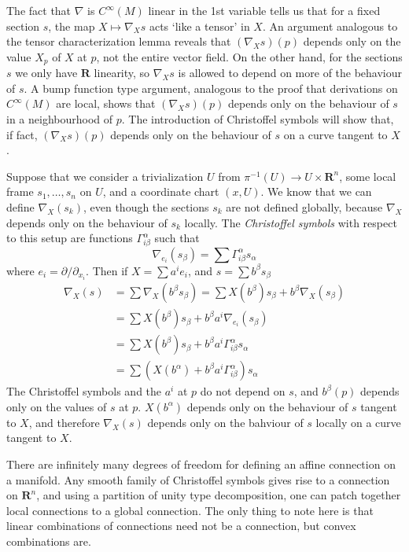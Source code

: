 The fact that $\nabla$ is $C^\infty(M)$ linear in the 1st variable tells us that for a fixed section $s$, the map $X \mapsto \nabla_X s$ acts `like a tensor' in $X$. An argument analogous to the tensor characterization lemma reveals that $(\nabla_X s)(p)$ depends only on the value $X_p$ of $X$ at $p$, not the entire vector field. On the other hand, for the sections $s$ we only have $\mathbf{R}$ linearity, so $\nabla_X s$ is allowed to depend on more of the behaviour of $s$. A bump function type argument, analogous to the proof that derivations on $C^\infty(M)$ are local, shows that $(\nabla_X s)(p)$ depends only on the behaviour of $s$ in a neighbourhood of $p$. The introduction of Christoffel symbols will show that, if fact, $(\nabla_X s)(p)$ depends only on the behaviour of $s$ on a curve tangent to $X$.

Suppose that we consider a trivialization $U$ from $\pi^{-1}(U) \to U \times \mathbf{R}^n$, some local frame $s_1, \dots, s_n$ on $U$, and a coordinate chart $(x,U)$. We know that we can define $\nabla_X(s_k)$, even though the sections $s_k$ are not defined globally, because $\nabla_X$ depends only on the behaviour of $s_k$ locally.  The \emph{Christoffel symbols} with respect to this setup are functions $\Gamma_{i \beta}^\alpha$ such that
%
\[ \nabla_{e_i}(s_\beta) = \sum \Gamma_{i \beta}^\alpha s_\alpha \]
%
where $e_i = \partial/\partial_{x_i}$. Then if $X = \sum a^i e_i$, and $s = \sum b^\beta s_\beta$
%
\begin{align*}
    \nabla_X(s) &= \sum \nabla_X(b^\beta s_\beta) = \sum X(b^\beta) s_\beta + b^\beta \nabla_X(s_\beta)\\
    &= \sum X(b^\beta) s_\beta + b^\beta a^i \nabla_{e_i}(s_\beta)\\
    &= \sum X(b^\beta) s_\beta + b^\beta a^i \Gamma_{i \beta}^\alpha s_\alpha\\
    &= \sum \left( X(b^\alpha) + b^\beta a^i \Gamma_{i \beta}^\alpha \right) s_\alpha
\end{align*}
%
The Christoffel symbols and the $a^i$ at $p$ do not depend on $s$, and $b^\beta(p)$ depends only on the values of $s$ at $p$. $X(b^\alpha)$ depends only on the behaviour of $s$ tangent to $X$, and therefore $\nabla_X(s)$ depends only on the bahviour of $s$ locally on a curve tangent to $X$.

There are infinitely many degrees of freedom for defining an affine connection on a manifold. Any smooth family of Christoffel symbols gives rise to a connection on $\mathbf{R}^n$, and using a partition of unity type decomposition, one can patch together local connections to a global connection. The only thing to note here is that linear combinations of connections need not be a connection, but convex combinations are.

